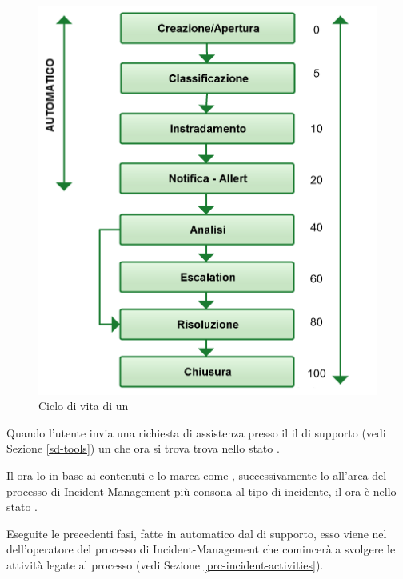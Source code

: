 \begin{figure}[htbp]
\centering
\includegraphics[scale=0.4]{Images/Diagrams/Ticket_life_cycle.png}
\caption{Ciclo di vita di un }
\label{prc-incident-status}
\end{figure}

Quando l'utente invia una richiesta di assistenza presso il  il  di supporto (vedi Sezione \ref{sd-tools})  un  che ora si trova trova nello stato .

Il  ora lo  in base ai contenuti e lo marca come , successivamente lo  all'area del processo di \ac{Incident-Management} più consona al tipo di incidente, il  ora è nello stato .

Eseguite le precedenti fasi, fatte in automatico dal  di supporto, esso viene  nel  dell'operatore del processo di \ac{Incident-Management} che comincerà a svolgere le attività legate al processo (vedi Sezione \ref{prc-incident-activities}).

